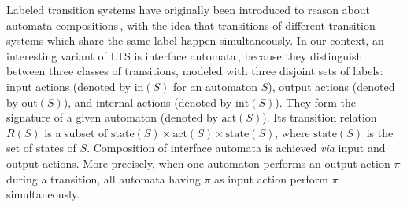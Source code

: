 Labeled transition systems have originally been introduced to reason about
automata compositions\,\cite{loiseaux1995lts}, with the idea that transitions of
different transition systems which share the same label happen simultaneously.
%
In our context, an interesting variant of LTS is interface
automata\,\cite{de2001interfaceautomata}, because they distinguish between three
classes of transitions, modeled with three disjoint sets of labels: input
actions (denoted by \( \mathrm{in}(S) \) for an automaton \( S \)), output
actions (denoted by \( \mathrm{out}(S) \)), and internal actions (denoted by
\( \mathrm{int}(S) \)).
%
They form the signature of a given automaton (denoted by \( \mathrm{act}(S) \)).
%
Its transition relation \( R(S) \) is a subset of
\( \mathrm{state}(S) \times \mathrm{act}(S) \times \mathrm{state}(S) \), where
\( \mathrm{state}(S) \) is the set of states of \( S \).
%
Composition of interface automata is achieved \emph{via} input and output
actions.
%
More precisely, when one automaton performs an output action \( \pi \) during a
transition, all automata having \( \pi \) as input action perform \( \pi \)
simultaneously.

